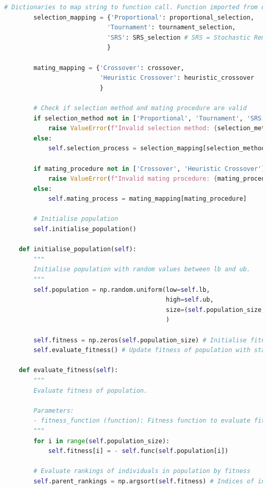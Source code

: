 \documentclass[10pt]{article}
\begin{document}
\begin{lstlisting}[language=Python, caption=CGA.py, label=CGApy]
        # Dictionaries to map string to function call. Function imported from directory files
        selection_mapping = {'Proportional': proportional_selection, 
                            'Tournament': tournament_selection, 
                            'SRS': SRS_selection # SRS = Stochastic Remainder Selection without Replacement
                            } 
        
        mating_mapping = {'Crossover': crossover,
                          'Heuristic Crossover': heuristic_crossover 
                          }

        # Check if selection method and mating procedure are valid
        if selection_method not in ['Proportional', 'Tournament', 'SRS']:
            raise ValueError(f"Invalid selection method: {selection_method}")
        else:
            self.selection_process = selection_mapping[selection_method]

        if mating_procedure not in ['Crossover', 'Heuristic Crossover']:
            raise ValueError(f"Invalid mating procedure: {mating_procedure}")
        else:
            self.mating_process = mating_mapping[mating_procedure]

        # Initialise population
        self.initialise_population() 
        
    def initialise_population(self):
        """
        Initialise population with random values between lb and ub.
        """
        self.population = np.random.uniform(low=self.lb, 
                                            high=self.ub, 
                                            size=(self.population_size, self.chromosome_length)
                                            )
        
        self.fitness = np.zeros(self.population_size) # Initialise fitness of population
        self.evaluate_fitness() # Update fitness of population with starting individual

    def evaluate_fitness(self):
        """
        Evaluate fitness of population.

        Parameters:
        - fitness_function (function): Fitness function to evaluate fitness of population
        """
        for i in range(self.population_size):
            self.fitness[i] = - self.func(self.population[i])

        # Evaluate rankings of individuals in population by fitness
        self.parent_rankings = np.argsort(self.fitness) # Indices of individuals in order of fitness


\end{lstlisting}
\end{document}
